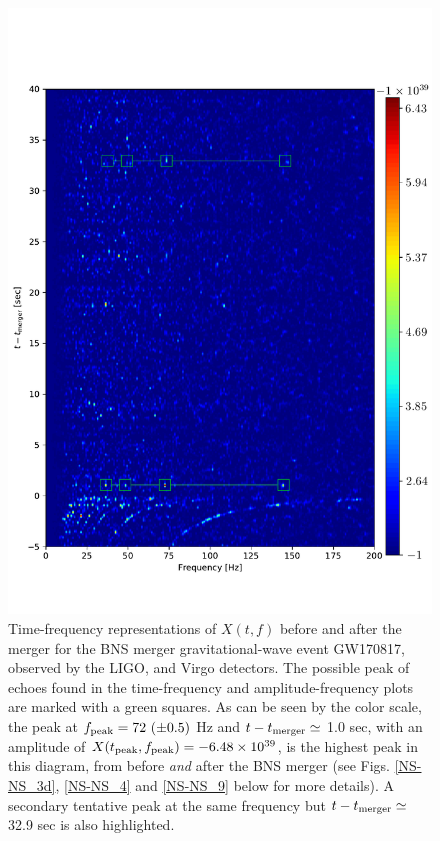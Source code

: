 \documentclass[a4paper,11pt]{article}
\begin{document}
\begin{figure}[!tbp]
    \includegraphics[width=\textwidth]{spectrogram_color.pdf}
 \caption{Time-frequency representations of $X(t,f)$ before and after the merger for the BNS merger gravitational-wave event GW170817, observed by the LIGO, and Virgo detectors. The possible peak of echoes found in the time-frequency and amplitude-frequency plots are marked with a green squares. As can be seen by the color scale, the peak at $f_{\rm{peak}}=72\ (\pm 0.5)$ Hz and $t-t_{\rm{merger}} \simeq $ 1.0 sec, with an amplitude of $X(t_{\rm{peak}},f_{\rm{peak}})=-6.48 \times 10^{39}$, is the highest peak in this diagram, from before {\it and} after the BNS merger (see Figs. \ref{NS-NS_3d}, \ref{NS-NS_4} and \ref{NS-NS_9} below for more details). A secondary tentative peak at the same frequency but $t-t_{\rm{merger}} \simeq $ 32.9 sec is also highlighted.}
 \label{NS-NS_11}
\end{figure}
\end{document}
